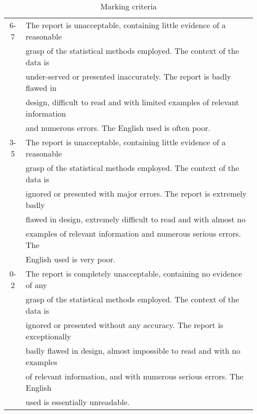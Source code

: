 \documentclass[11pt,a4paper]{article}
\begin{document}
\begin{table}
\begin{tabular}{|c|l|}
          \hline
       6-7  & The report is unacceptable, containing little evidence of a reasonable\\ &  grasp of the statistical methods employed.  The context of the data is \\ &  under-served or presented inaccurately. The report is badly flawed in\\ & design,  difficult to read and with limited examples of relevant information\\ & and numerous errors. The English used is often poor.\\
         \hline
        3-5 & The report is unacceptable, containing little evidence of a reasonable\\ &  grasp of the statistical methods employed.  The context of the data is \\ &  ignored or presented with major errors. The report is extremely badly \\ & flawed in design, extremely difficult to read and with almost no \\ & examples of relevant information and numerous serious errors.   The \\ & English used is very poor.\\
         \hline
        0-2 & The report is completely unacceptable, containing no evidence of any\\ &  grasp of the statistical methods employed.  The context of the data is \\ &  ignored or presented without any accuracy. The report is exceptionally \\ & badly flawed in design, almost impossible to read and with  no  examples \\ & of relevant information, and with numerous serious errors.   The   English \\ & used is essentially unreadable.\\
         \hline
    \end{tabular}
    \caption{Marking criteria}
    \label{tab:my_label}
\end{table}
\end{document}
